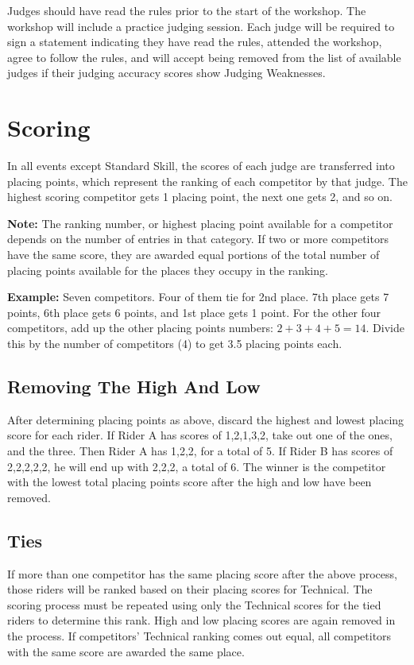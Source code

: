 Judges should have read the rules prior to the start of the workshop.
The workshop will include a practice judging session.
Each judge will be required to sign a statement indicating they have read the rules, attended the workshop, agree to follow the rules, and will accept being removed from the list of available judges if their judging accuracy scores show Judging Weaknesses.

\section{Scoring}
In all events except Standard Skill, the scores of each judge are transferred into placing points, which represent the ranking of each competitor by that judge.
The highest scoring competitor gets 1 placing point, the next one gets 2, and so on.

\textbf{Note:} The ranking number, or highest placing point available for a competitor depends on the number of entries in that category.
If two or more competitors have the same score, they are awarded equal portions of the total number of placing points available for the places they occupy in the ranking.

\textbf{Example:} Seven competitors.
Four of them tie for 2nd place.
7th place gets 7 points, 6th place gets 6 points, and 1st place gets 1 point.
For the other four competitors, add up the other placing points numbers: $2+3+4+5=14$.
Divide this by the number of competitors (4) to get 3.5 placing points each.

\subsection{Removing The High And Low}
After determining placing points as above, discard the highest and lowest placing score for each rider.
If Rider A has scores of 1,2,1,3,2, take out one of the ones, and the three.
Then Rider A has 1,2,2, for a total of 5.
If Rider B has scores of 2,2,2,2,2, he will end up with 2,2,2, a total of 6.
The winner is the competitor with the lowest total placing points score after the high and low have been removed.

\subsection{Ties}
If more than one competitor has the same placing score after the above process, those riders will be ranked based on their placing scores for Technical.
The scoring process must be repeated using only the Technical scores for the tied riders to determine this rank.
High and low placing scores are again removed in the process.
If competitors' Technical ranking comes out equal, all competitors with the same score are awarded the same place.

